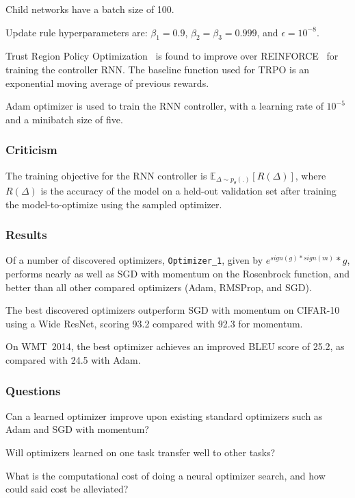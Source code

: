 \documentclass[a4paper, 12pt]{article}
\begin{document}
Child networks have a batch size of 100.

Update rule hyperparameters are: $\beta_1 = 0.9$, $\beta_2 = \beta_3 = 0.999$,
and $\epsilon = 10^{-8}$.

Trust Region Policy Optimization~\citet{DBLP:journals/corr/SchulmanLMJA15} is
found to improve over REINFORCE~\citet{Williams1992} for training the controller
RNN\@. The baseline function used for TRPO is an exponential moving average of
previous rewards.

Adam optimizer is used to train the RNN controller, with a learning rate of
$10^{-5}$ and a minibatch size of five.

\subsubsection{Criticism}

The training objective for the RNN controller is
$\mathbb{E}_{\Delta \sim p_\theta(.)}[R(\Delta)]$, where $R(\Delta)$ is the
accuracy of the model on a held-out validation set after training the
model-to-optimize using the sampled optimizer.

\subsubsection{Results}

Of a number of discovered optimizers, \verb|Optimizer_1|, given by $e^{sign(g)
* sign(m)} * g$, performs nearly as well as SGD with momentum on the Rosenbrock
function, and better than all other compared optimizers (Adam, RMSProp, and
SGD).

The best discovered optimizers outperform SGD with momentum on CIFAR-10 using a
Wide ResNet, scoring 93.2 compared with 92.3 for momentum.

On WMT~2014, the best optimizer achieves an improved BLEU score of 25.2, as
compared with 24.5 with Adam.

\subsubsection{Questions}

Can a learned optimizer improve upon existing standard optimizers such as Adam
and SGD with momentum?

Will optimizers learned on one task transfer well to other tasks?

What is the computational cost of doing a neural optimizer search, and how
could said cost be alleviated?
\end{document}
